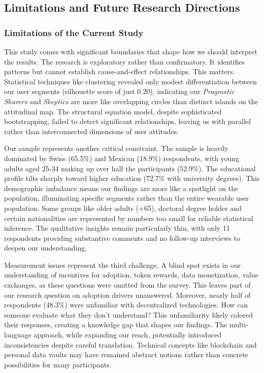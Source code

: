 \subsection{Limitations and Future Research Directions}
	\subsubsection{Limitations of the Current Study}
	This study comes with significant boundaries that shape how we should interpret the results. The research is exploratory rather than confirmatory. It identifies patterns but cannot establish cause-and-effect relationships. This matters. Statistical techniques like clustering revealed only modest differentiation between our user segments (silhouette score of just 0.20), indicating our \textit{Pragmatic Sharers} and \textit{Skeptics} are more like overlapping circles than distinct islands on the attitudinal map. The structural equation model, despite sophisticated bootstrapping, failed to detect significant relationships, leaving us with parallel rather than interconnected dimensions of user attitudes.
	
	Our sample represents another critical constraint. The sample is heavily dominated by Swiss (65.5\%) and Mexican (18.9\%) respondents, with young adults aged 25-34 making up over half the participants (52.9\%). The educational profile tilts sharply toward higher education (72.7\% with university degrees). This demographic imbalance means our findings are more like a spotlight on the population, illuminating specific segments rather than the entire wearable user population. Some groups like older adults (+65), doctoral degree holder and certain nationalities are represented by numbers too small for reliable statistical inference. The qualitative insights remain particularly thin, with only 11 respondents providing substantive comments and no follow-up interviews to deepen our understanding.
	
	Measurement issues represent the third challenge. A  blind spot exists in our understanding of incentives for adoption, token rewards, data monetization, value exchanges, as these questions were omitted from the survey. This leaves part of our research question on adoption drivers unanswered. Moreover, nearly half of respondents (48.3\%) were unfamiliar with decentralized technologies. How can someone evaluate what they don't understand? This unfamiliarity likely colored their responses, creating a knowledge gap that shapes our findings. The multi-language approach, while expanding our reach, potentially introduced inconsistencies despite careful translation. Technical concepts like blockchain and personal data vaults may have remained abstract notions rather than concrete possibilities for many participants.
	
